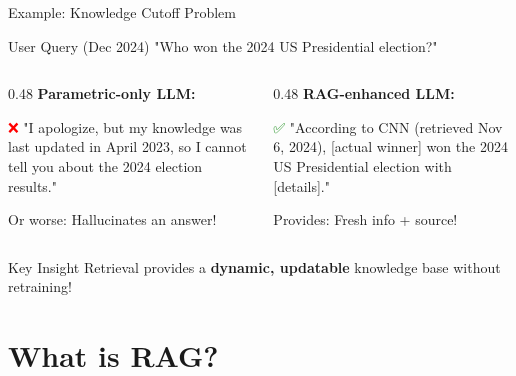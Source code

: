 \documentclass[aspectratio=169]{beamer}
\begin{document}
\begin{frame}{Example: Knowledge Cutoff Problem 📅}
\begin{block}{User Query (Dec 2024)}
"Who won the 2024 US Presidential election?"
\end{block}

\vspace{0.5em}

\begin{columns}[T]
\begin{column}{0.48\textwidth}
\textbf{Parametric-only LLM:}

\vspace{0.3em}

\textcolor{red}{❌} "I apologize, but my knowledge was last updated in April 2023, so I cannot tell you about the 2024 election results."

\vspace{0.5em}

Or worse: Hallucinates an answer!
\end{column}

\begin{column}{0.48\textwidth}
\textbf{RAG-enhanced LLM:}

\vspace{0.3em}

\textcolor{green}{✅} "According to CNN (retrieved Nov 6, 2024), [actual winner] won the 2024 US Presidential election with [details]."

\vspace{0.5em}

Provides: Fresh info + source!
\end{column}
\end{columns}

\vspace{0.5em}

\begin{alertblock}{Key Insight}
Retrieval provides a \textbf{dynamic, updatable} knowledge base without retraining!
\end{alertblock}
\end{frame}

\section{What is RAG?}
\end{document}
